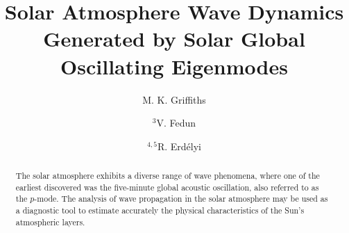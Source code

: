 \documentclass[preprint,authoryear,12pt]{elsarticle}
\begin{document}
\begin{frontmatter}





\title{Solar Atmosphere Wave Dynamics Generated by Solar Global Oscillating Eigenmodes}


\author{M. K. Griffiths}
\address{$^1$Solar Physics and Space Plasma Research Centre ($SP^{2}RC$), School of Mathematics and 
Statistics, University of Sheffield, Hicks Building, Hounsfield Road, S7 3RH, UK}
\address{$^2$Corporate Information and Computing Services, The University of Sheffield, 10-12
Brunswick Street, Sheffeld, S10 2FN, UK.}

\author{$^3$V. Fedun}
\address{$^3$Department of Automatic Control and Systems Engineering, The University of Sheffield, Mappin Street, Sheffield, S1 3JD, UK}

\author{$^{4,5}$R. Erd\'{e}lyi}
\address{$^4$Solar Physics and Space Plasma Research Centre ($SP^{2}RC$), School of Mathematics and 
Statistics, University of Sheffield, Hicks Building, Hounsfield Road, S7 3RH, UK}
\address{$^5$Department of Astronomy, E\"otv\"os Lor\'and University, P.O.Box 32, Budapest, H-1518 Hungary}


\begin{abstract}
The solar atmosphere exhibits a diverse range of wave phenomena, where one of the earliest discovered was the five-minute 
global acoustic oscillation, also referred to as the $p$-mode. The analysis of wave propagation in the solar atmosphere may be used as a diagnostic tool to estimate accurately the physical characteristics of the  Sun's atmospheric layers. 


\end{abstract}
\end{frontmatter}
\end{document}
